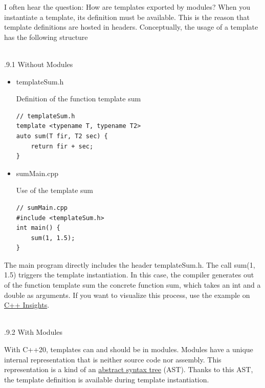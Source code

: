 
I often hear the question: How are templates exported by modules? When you instantiate a template, its definition must be available. This is the reason that template definitions are hosted in headers. Conceptually, the usage of a template has the following structure

\hspace*{\fill} \\ %
.9.1\hspace{0.2cm} Without Modules

\begin{itemize}
\item 
templateSum.h

\noindent
Definition of the function template sum
\begin{lstlisting}[style=styleCXX]
// templateSum.h
template <typename T, typename T2>
auto sum(T fir, T2 sec) {
	return fir + sec;
}
\end{lstlisting}

\item 
sumMain.cpp

\noindent
Use of the template sum
\begin{lstlisting}[style=styleCXX]
// sumMain.cpp
#include <templateSum.h>
int main() {
	sum(1, 1.5);
}
\end{lstlisting}
\end{itemize}

The main program directly includes the header templateSum.h. The call sum(1, 1.5) triggers the template instantiation. In this case, the compiler generates out of the function template sum the concrete function sum, which takes an int and a double as arguments. If you want to visualize this process, use the example on \href{https://cppinsights.io/}{C++ Insights}.

\hspace*{\fill} \\ %
.9.2\hspace{0.2cm} With Modules

With C++20, templates can and should be in modules. Modules have a unique internal representation that is neither source code nor assembly. This representation is a kind of an \href{https://en.wikipedia.org/wiki/Abstract_syntax_tree}{abstract syntax tree} (AST). Thanks to this AST, the template definition is available during template instantiation.

